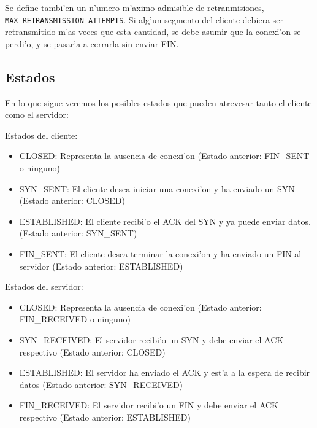 Se define tambi'en un n'umero m'aximo admisible de retranmisiones, \texttt{MAX\_RETRANSMISSION\_ATTEMPTS}. Si alg'un segmento del cliente debiera ser retransmitido m'as veces que esta cantidad, se debe asumir que la conexi'on se perdi'o, y se pasar'a a cerrarla sin enviar FIN. 

\subsection{Estados}

En lo que sigue veremos los posibles estados que pueden atrevesar tanto el cliente como el servidor:

Estados del cliente:

\begin{itemize}
	\item CLOSED: Representa la ausencia de conexi'on (Estado anterior: FIN\_SENT o ninguno)
	\item SYN\_SENT: El cliente desea iniciar una conexi'on y ha enviado un SYN (Estado anterior: CLOSED)
	\item ESTABLISHED: El cliente recibi'o el ACK del SYN y ya puede enviar datos. (Estado anterior: SYN\_SENT)
	\item FIN\_SENT: El cliente desea terminar la conexi'on y ha enviado un FIN al servidor (Estado anterior: ESTABLISHED)
\end{itemize}

Estados del servidor: 

\begin{itemize}
	\item CLOSED: Representa la ausencia de conexi'on (Estado anterior: FIN\_RECEIVED o ninguno)
	\item SYN\_RECEIVED: El servidor recibi'o un SYN y debe enviar el ACK respectivo (Estado anterior: CLOSED)
	\item ESTABLISHED: El servidor ha enviado el ACK y est'a a la espera de recibir datos (Estado anterior: SYN\_RECEIVED)
	\item FIN\_RECEIVED: El servidor recibi'o un FIN y debe enviar el ACK respectivo (Estado anterior: ESTABLISHED)
\end{itemize}
